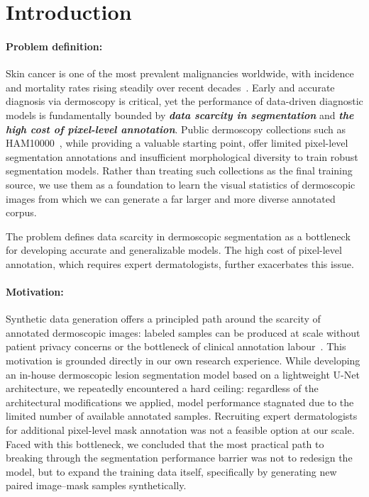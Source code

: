 \section{Introduction}

\paragraph{Problem definition:}
Skin cancer is one of the most prevalent malignancies worldwide, with incidence 
and mortality rates rising steadily over recent decades~\cite{Wang_M}. Early and 
accurate diagnosis via dermoscopy is critical, yet the performance of data-driven 
diagnostic models is fundamentally bounded by \textbf{\emph{data scarcity in segmentation}} and \textbf{\emph{the high 
cost of pixel-level annotation}}. Public dermoscopy collections such as HAM10000~\cite{Tschandl2018HAM10000}, 
while providing a valuable starting point, offer limited pixel-level segmentation 
annotations and insufficient morphological diversity to train robust segmentation 
models. Rather than treating such collections as the final training source, 
we use them as a foundation to learn the visual statistics of dermoscopic 
images from which we can generate a far larger and more diverse annotated corpus. 

The problem defines data scarcity in dermoscopic segmentation as a bottleneck for developing accurate and generalizable models. The high cost of pixel-level annotation, which requires expert dermatologists, further exacerbates this issue. 

\paragraph{Motivation:}
Synthetic data generation offers a principled path around the scarcity of annotated
dermoscopic images: labeled samples can be produced at scale without patient privacy
concerns or the bottleneck of clinical annotation labour~\cite{du2024boosting}. This motivation
is grounded directly in our own research experience. While developing an in-house
dermoscopic lesion segmentation model based on a lightweight U-Net architecture,
we repeatedly encountered a hard ceiling: regardless of the architectural
modifications we applied, model performance stagnated due to the limited number
of available annotated samples. Recruiting expert dermatologists for additional
pixel-level mask annotation was not a feasible option at our scale.
Faced with this bottleneck, we concluded that the most practical path to breaking
through the segmentation performance barrier was not to redesign the model, but to
expand the training data itself, specifically by generating new paired image--mask
samples synthetically.

